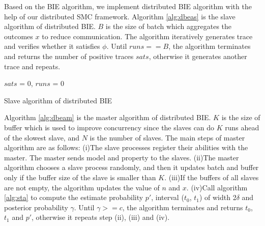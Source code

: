 Based on the BIE algorithm, we implement distributed BIE algorithm with the help of our distributed SMC framework. Algorithm \ref{alg:dbeas} is the slave algorithm of distributed BIE. $B$ is the size of batch which aggregates the outcomes $x$ to reduce communication. The algorithm iteratively generates trace and verifies whether it satisfies $\phi$. Until $runs == B$, the algorithm terminates and returns the number of positive traces $sats$, otherwise it generates another trace and repeats.

\begin{algorithm}[t]
{}
$sats$ = 0, $runs$ = 0\;
\caption{Slave algorithm of distributed BIE}
\label{alg:dbeas}
\end{algorithm}

Algorithm \ref{alg:dbeam} is the master algorithm of distributed BIE. $K$ is the size of buffer which is used to improve concurrency since the slaves can do $K$ runs ahead of the slowest slave, and $N$ is the number of slaves. The main steps of master algorithm are as follows: (i)The slave processes register their abilities with the master. The master sends model and property to the slaves. (ii)The master algorithm chooses a slave process randomly, and then it updates batch and buffer only if the buffer size of the slave is smaller than $K$. (iii)If the buffers of all slaves are not empty, the algorithm updates the value of $n$ and $x$. (iv)Call algorithm \ref{alg:sta} to compute the estimate probability $p'$, interval ($t_0$, $t_1$) of width 2$\delta$ and posterior probability $\gamma$. Until $\gamma >= c$, the algorithm terminates and returns $t_0$, $t_1$ and $p'$, otherwise it repeats step (ii), (iii) and (iv).


